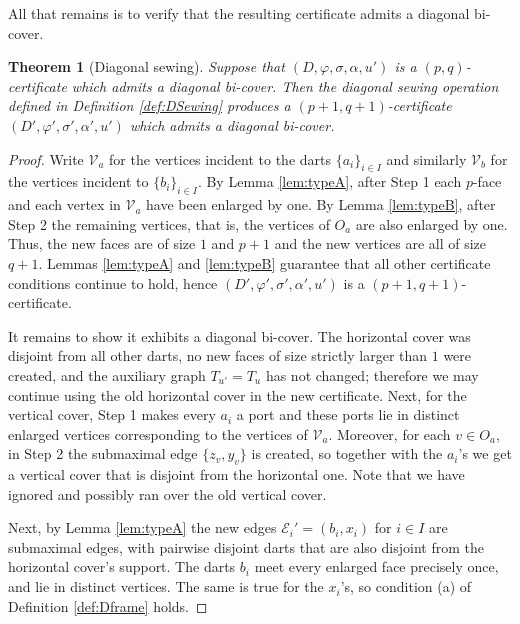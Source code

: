 \documentclass[11pt]{article}
\newtheorem{theorem}{Theorem}[section]
\theoremstyle{remark}
\newcommand{\cV}{\mathcal V}
\newcommand{\cE}{\mathcal E}
\begin{document}
All that remains is to verify that the resulting certificate admits a diagonal bi-cover. 

\begin{theorem}[Diagonal sewing]\label{thm:DSewing} Suppose that $(D,\varphi, \sigma,\alpha, u')$ is a $(p,q)$-certificate which admits a diagonal bi-cover. Then the diagonal sewing operation defined in Definition \ref{def:DSewing} produces a $(p+1,q+1)$-certificate $(D',\varphi', \sigma',\alpha', u')$ which admits a diagonal bi-cover.
\end{theorem}
\begin{proof} Write $\cV_a$ for the vertices incident to the darts $\{a_i\}_{i\in I}$ and similarly $\cV_b$ for the vertices incident to $\{b_i\}_{i\in I}$. By Lemma \ref{lem:typeA}, after Step 1 each $p$-face and each vertex in $\cV_a$ have been enlarged by one. By Lemma \ref{lem:typeB}, after Step 2 the remaining vertices, that is, the vertices of $O_a$ are also enlarged by one. Thus, the new faces are of size $1$ and $p+1$ and the new vertices are all of size $q+1$. Lemmas \ref{lem:typeA} and \ref{lem:typeB} guarantee that all other  certificate conditions continue to hold, hence  $(D',\varphi', \sigma',\alpha', u')$ is a $(p+1,q+1)$-certificate.

It remains to show it exhibits a diagonal bi-cover. The horizontal cover was disjoint from all other darts, no new faces of size strictly larger than $1$ were created, and the auxiliary graph $T_{u'}=T_u$ has not changed; therefore we may continue using the old horizontal cover in the new certificate. Next, for the vertical cover, Step 1 makes every $a_i$ a port and these ports lie in distinct enlarged vertices corresponding to the vertices of $\cV_a$. Moreover, for each $v \in O_a$, in Step 2 the submaximal edge $\{z_v, y_v\}$ is created, so together with the $a_i$'s we get a vertical cover that is disjoint from the horizontal one. Note that we have ignored and possibly ran over the old vertical cover. 

Next, by Lemma \ref{lem:typeA} the new edges $\cE_i'=(b_i, x_i)$ for $i\in I$ are submaximal edges, with pairwise disjoint darts that are also disjoint from the horizontal cover's support. The darts $b_i$ meet every enlarged face precisely once, and lie in distinct vertices. The same is true for the $x_i$'s, so condition (a) of Definition \ref{def:Dframe} holds.


\end{proof}
\end{document}
